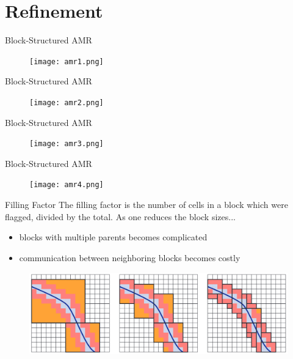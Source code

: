 \documentclass{beamer}
\begin{document}
\section{Refinement}

\begin{frame}{Block-Structured AMR}
    \begin{figure}
        \center
        \texttt{[image: amr1.png]}
    \end{figure}
\end{frame}

\begin{frame}{Block-Structured AMR}
    \begin{figure}
        \center
        \texttt{[image: amr2.png]}
    \end{figure}
\end{frame}

\begin{frame}{Block-Structured AMR}
    \begin{figure}
        \center
        \texttt{[image: amr3.png]}
    \end{figure}
\end{frame}

\begin{frame}{Block-Structured AMR}
    \begin{figure}
        \center
        \texttt{[image: amr4.png]}
    \end{figure}
\end{frame}

\begin{frame}{Filling Factor}
    The filling factor is the number of cells in a block which were flagged, divided by the total.
    As one reduces the block sizes...
    \begin{itemize}
        \item blocks with multiple parents becomes complicated
        \item communication between neighboring blocks becomes costly
    \end{itemize}
    \begin{figure}
        \center
        \includegraphics[scale=0.18]{filling.png}
    \end{figure}
\end{frame}
\end{document}
